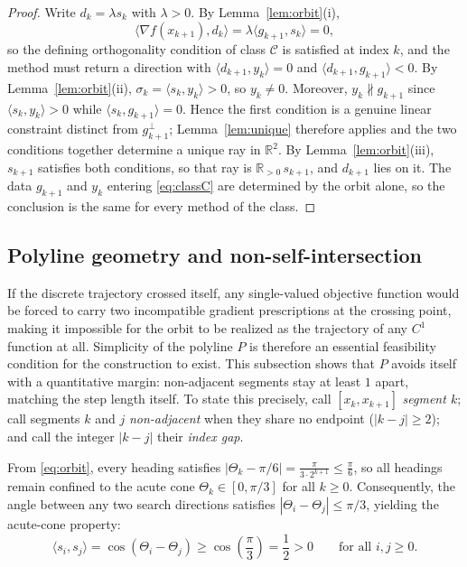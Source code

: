 \documentclass[11pt]{article}
\newcommand{\R}{\mathbb{R}}
\newcommand{\ip}[2]{\langle #1,#2\rangle}
\begin{document}
\begin{proof}
Write $d_k = \lambda s_k$ with $\lambda > 0$. By Lemma~\ref{lem:orbit}(i),
\[
\ip{\nabla f(x_{k+1})}{d_k} = \lambda \ip{g_{k+1}}{s_k} = 0,
\]
so the defining orthogonality condition of class $\mathcal C$ is satisfied at index $k$, and the method must return a direction with $\ip{d_{k+1}}{y_k} = 0$ and $\ip{d_{k+1}}{g_{k+1}} < 0$.
By Lemma~\ref{lem:orbit}(ii), $\sigma_k = \ip{s_k}{y_k} > 0$, so $y_k \ne 0$. Moreover, $y_k \not\parallel g_{k+1}$ since $\ip{s_k}{y_k} > 0$ while $\ip{s_k}{g_{k+1}} = 0$.
Hence the first condition is a genuine linear constraint distinct from $g_{k+1}^\perp$; Lemma~\ref{lem:unique} therefore applies and the two conditions together determine a unique ray in $\R^2$. By Lemma~\ref{lem:orbit}(iii), $s_{k+1}$ satisfies both conditions, so that ray is $\R_{>0}\,s_{k+1}$, and $d_{k+1}$ lies on it. The data $g_{k+1}$ and $y_k$ entering \eqref{eq:classC} are determined by the orbit alone, so the conclusion is the same for every method of the class.
\end{proof}

\subsection{Polyline geometry and non-self-intersection}
\label{sec:geom}

If the discrete trajectory crossed itself, any single-valued objective function would be forced to carry two incompatible gradient prescriptions at the crossing point, making it impossible for the orbit to be realized as the trajectory of any $C^1$ function at all.
Simplicity of the polyline $P$ is therefore an essential feasibility condition for the construction to exist.
This subsection shows that $P$ avoids itself with a quantitative margin: non-adjacent segments stay at least $1$ apart, matching the step length itself.
To state this precisely, call $[x_k, x_{k+1}]$ \emph{segment $k$}; call segments $k$ and $j$ \emph{non-adjacent} when they share no endpoint ($|k-j| \ge 2$); and call the integer $|k-j|$ their \emph{index gap}.

From \eqref{eq:orbit}, every heading satisfies $|\Theta_k - \pi/6| = \frac{\pi}{3 \cdot 2^{k+1}} \le \frac{\pi}{6}$, so all headings remain confined to the acute cone $\Theta_k \in [0, \pi/3]$ for all $k \ge 0$.
Consequently, the angle between any two search directions satisfies $|\Theta_i - \Theta_j| \le \pi/3$, yielding the acute-cone property:
\begin{equation}
\label{eq:acute-cone}
\ip{s_i}{s_j} = \cos(\Theta_i - \Theta_j) \ge \cos\left(\frac{\pi}{3}\right) = \frac12 > 0 \qquad \text{for all } i, j \ge 0.
\end{equation}
\end{document}
